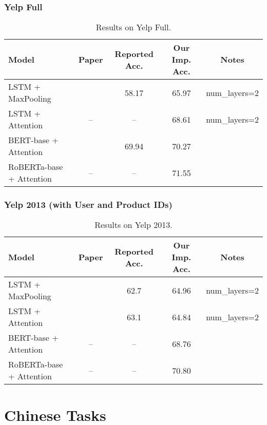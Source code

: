 \documentclass{article}
\begin{document}
\subsubsection{Yelp Full}
\begin{table}[H]
    \centering
    \begin{tabular}{lcccc}
    \toprule
    Model & Paper & Reported Acc. & Our Imp. Acc. & Notes \\
    \midrule
    LSTM + MaxPooling        & \citet{zhang2015character} & 58.17 & 65.97 & num\_layers=2 \\
    LSTM + Attention         & --                         & --    & 68.61 & num\_layers=2 \\
    BERT-base + Attention    & \citet{sun2019fine}        & 69.94 & 70.27 \\
    RoBERTa-base + Attention & --                         & --    & 71.55 \\
    \bottomrule
    \end{tabular}
    \caption{Results on Yelp Full.} 
\end{table}


\subsubsection{Yelp 2013 (with User and Product IDs)}
\begin{table}[H]
    \centering
    \begin{tabular}{lcccc}
    \toprule
    Model & Paper & Reported Acc. & Our Imp. Acc. & Notes \\
    \midrule
    LSTM + MaxPooling        & \citet{chen2016neural} & 62.7  & 64.96 & num\_layers=2 \\
    LSTM + Attention         & \citet{chen2016neural} & 63.1  & 64.84 & num\_layers=2 \\
    BERT-base + Attention    & --                     & --    & 68.76 \\
    RoBERTa-base + Attention & --                     & --    & 70.80 \\
    \bottomrule
    \end{tabular}
    \caption{Results on Yelp 2013.} 
\end{table}


\newpage
\section{Chinese Tasks}
\end{document}
